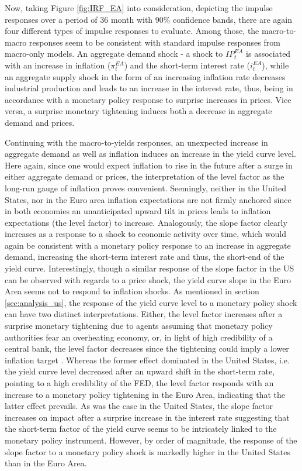Now, taking Figure \ref{fig:IRF_EA} into consideration, depicting the impulse responses over a period of 36 month with 90\% confidence bands, there are again four different types of impulse responses to evaluate. 
Among those, the macro-to-macro responses seem to be consistent with standard impulse responses from macro-only models. 
An aggregate demand shock - a shock to $IP^{EA}_{t}$ is associated with an increase in inflation ($\pi^{EA}_{t}$) and the short-term interest rate ($i^{EA}_{t}$), while an aggregate supply shock in the form of an increasing inflation rate decreases industrial production and leads to an increase in the interest rate, thus, being in accordance with a monetary policy response to surprise increases in prices. 
Vice versa, a surprise monetary tightening induces both a decrease in aggregate demand and prices. 

Continuing with the macro-to-yields responses, an unexpected increase in aggregate demand as well as inflation induces an increase in the yield curve level. 
Here again, since one would expect inflation to rise in the future after a surge in either aggregate demand or prices, the interpretation of the level factor as the long-run gauge of inflation proves convenient.
Seemingly, neither in the United States, nor in the Euro area inflation expectations are not firmly anchored since in both economies an unanticipated upward tilt in prices leads to inflation expectations (the level factor) to increase.
Analogously, the slope factor clearly increases as a response to a shock to economic activity over time, which would again be consistent with a monetary policy response to an increase in aggregate demand, increasing the short-term interest rate and thus, the short-end of the yield curve. 
Interestingly, though a similar response of the slope factor in the US can be observed with regards to a price shock, the yield curve slope in the Euro Area seems not to respond to inflation shocks.  
As mentioned in section \ref{sec:analysis_us}, the response of the yield curve level to a monetary policy shock can have two distinct interpretations.
Either, the level factor increases after a surprise monetary tightening due to agents assuming that monetary policy authorities fear an overheating economy, or, in light of high credibility of a central bank, the level factor decreases since the tightening could imply a lower inflation target \citep{diebold2006macroeconomy}. 
Whereas the former effect dominated in the United States, i.e. the yield curve level decreased after an upward shift in the short-term rate, pointing to a high credibility of the FED, the level factor responds with an increase to a monetary policy tightening in the Euro Area, indicating that the latter effect prevails. 
As was the case in the United States, the slope factor increases on impact after a surprise increase in the interest rate suggesting that the short-term factor of the yield curve seems to be intricately linked to the monetary policy instrument. 
However, by order of magnitude, the response of the slope factor to a monetary policy shock is markedly higher in the United States than in the Euro Area. 

